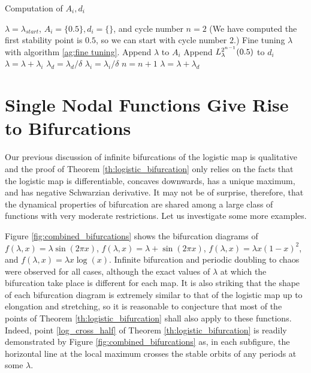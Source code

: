 \begin{algorithm}
	\caption{Computation of $A_i, d_i$}
	\begin{algorithmic}[1]
		\Require $\lambda = \lambda_{start}$, $A_i = \{0.5\}, d_i = \{\}$, and cycle number $n = 2$ (We have computed the first stability point is $0.5$, so we can start with cycle number $2$.)
		  
			\State Fine tuning $\lambda$ with algorithm \ref{ag:fine tuning}.
			\State Append $\lambda$ to $A_i$ 
			\State Append $L_{\lambda}^{2^{n-1}}(0.5)$ to $d_i$ 
			\State $\lambda = \lambda + \lambda_{i}$
			\State $\lambda_{d} = \lambda_d / \delta$  
			\State $\lambda_{i} = \lambda_i / \delta$
			\State $n = n + 1$
		\EndIf
		\State $\lambda = \lambda + \lambda_d$
		\EndWhile
	\end{algorithmic}
	\label{ag:compute A_i}
\end{algorithm}

\section{Single Nodal Functions Give Rise to Bifurcations}

Our previous discussion of infinite bifurcations of the logistic map is qualitative and the proof of Theorem \ref{th:logistic_bifurcation} only relies on the facts that the logistic map is differentiable, concaves downwards, has a unique maximum, and has negative Schwarzian derivative. 
It may not be of surprise, therefore, that the dynamical properties of bifurcation are shared among a large class of functions with very moderate restrictions.
Let us investigate some more examples.

Figure \ref{fig:combined_bifurcations} shows the bifurcation diagrams of $f(\lambda, x) = \lambda \sin(2\pi x)$, $f(\lambda, x) = \lambda + \sin(2\pi x)$, $f(\lambda, x) = \lambda x(1-x)^2$, and $f(\lambda, x) = \lambda x \log(x)$.
Infinite bifurcation and periodic doubling to chaos were observed for all cases, although the exact values of $\lambda$ at which the bifurcation take place is different for each map.
It is also striking that the shape of each bifurcation diagram is extremely similar to that of the logistic map up to elongation and stretching, so it is reasonable to conjecture that most of the points of Theorem \ref{th:logistic_bifurcation} shall also apply to these functions.
Indeed, point \ref{log_cross_half} of Theorem \ref{th:logistic_bifurcation} is readily demonstrated by Figure \ref{fig:combined_bifurcations}
as, in each subfigure, the horizontal line at the local maximum crosses the stable orbits of any periods at some $\lambda$.

